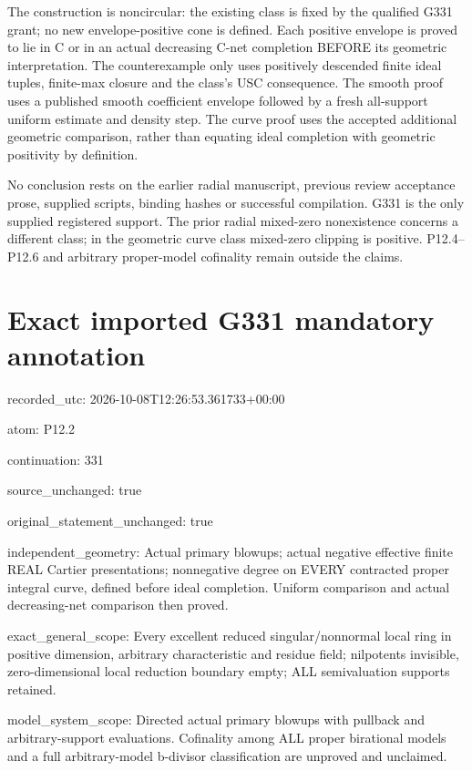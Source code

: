 \documentclass[11pt]{article}
\begin{document}
The construction is noncircular: the existing class is fixed by the qualified G331 grant; no new envelope-positive cone is defined. Each positive envelope is proved to lie in C or in an actual decreasing C-net completion BEFORE its geometric interpretation. The counterexample only uses positively descended finite ideal tuples, finite-max closure and the class's USC consequence. The smooth proof uses a published smooth coefficient envelope followed by a fresh all-support uniform estimate and density step. The curve proof uses the accepted additional geometric comparison, rather than equating ideal completion with geometric positivity by definition.

No conclusion rests on the earlier radial manuscript, previous review acceptance prose, supplied scripts, binding hashes or successful compilation. G331 is the only supplied registered support. The prior radial mixed-zero nonexistence concerns a different class; in the geometric curve class mixed-zero clipping is positive. P12.4--P12.6 and arbitrary proper-model cofinality remain outside the claims.

\section{Exact imported G331 mandatory annotation}

recorded\_utc: 2026-10-08T12:26:53.361733+00:00

atom: P12.2

continuation: 331

source\_unchanged: true

original\_statement\_unchanged: true

independent\_geometry: Actual primary blowups; actual negative effective finite REAL Cartier presentations; nonnegative degree on EVERY contracted proper integral curve, defined before ideal completion. Uniform comparison and actual decreasing-net comparison then proved.

exact\_general\_scope: Every excellent reduced singular/nonnormal local ring in positive dimension, arbitrary characteristic and residue field; nilpotents invisible, zero-dimensional local reduction boundary empty; ALL semivaluation supports retained.

model\_system\_scope: Directed actual primary blowups with pullback and arbitrary-support evaluations. Cofinality among ALL proper birational models and a full arbitrary-model b-divisor classification are unproved and unclaimed.
\end{document}
